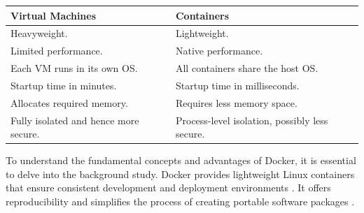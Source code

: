 \begin{table}[h]
    \begin{tabular}{|l|l|}
    \hline
    \textbf{Virtual Machines}             & \textbf{Containers}                            \\ \hline
    Heavyweight.                          & Lightweight.                                   \\
    Limited performance.                  & Native performance.                            \\
    Each VM runs in its own OS.           & All containers share the host OS.              \\
    Startup time in minutes.              & Startup time in milliseconds.                  \\
    Allocates required memory.            & Requires less memory space.                    \\
    Fully isolated and hence more secure. & Process-level isolation, possibly less secure. \\ \hline
    \end{tabular}
\end{table}

To understand the fundamental concepts and advantages of Docker, it is essential to delve into the background study. Docker provides lightweight Linux containers that ensure consistent development and deployment environments \citep{merkel2014docker}. It offers reproducibility and simplifies the process of creating portable software packages \citep{boettiger2015introduction}. 